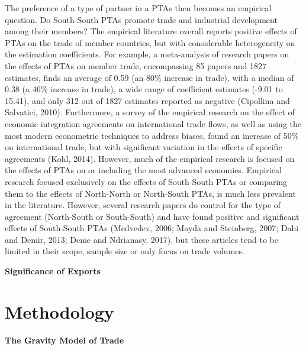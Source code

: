 \documentclass[12pt]{article}%
\begin{document}
The preference of a type of partner in a PTAs then becomes an empirical
question. Do South-South PTAs promote trade and industrial development
among their members? The empirical literature overall reports positive
effects of PTAs on the trade of member countries, but with considerable
heterogeneity on the estimation coefficients. For example, a
meta-analysis of research papers on the effects of PTAs on member trade,
encompassing 85 papers and 1827 estimates, finds an average of 0.59 (an
80\% increase in trade), with a median of 0.38 (a 46\% increase in
trade), a wide range of coefficient estimates (-9.01 to 15.41), and only
312 out of 1827 estimates reported as negative (Cipollina and Salvatici,
2010). Furthermore, a survey of the empirical research on the effect of
economic integration agreements on international trade flows, as well as
using the most modern econometric techniques to address biases, found an
increase of 50\% on international trade, but with significant variation
in the effects of specific agreements (Kohl, 2014). However, much of the
empirical research is focused on the effects of PTAs on or including the
most advanced economies. Empirical research focused exclusively on the
effects of South-South PTAs or comparing them to the effects of
North-North or North-South PTAs, is much less prevalent in the
literature. However, several research papers do control for the type of
agreement (North-South or South-South) and have found positive and
significant effects of South-South PTAs (Medvedev, 2006; Mayda and
Steinberg, 2007; Dahi and Demir, 2013; Deme and Ndrianasy, 2017), but
these articles tend to be limited in their scope, sample size or only
focus on trade volumes.

\textbf{Significance of Exports}

%
\section{Methodology}%
\label{sec:Methodology}%
\textbf{The Gravity Model of Trade}
\end{document}
